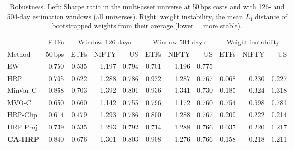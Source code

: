 \begin{table}[!htbp]\centering\small
\caption{Robustness. Left: Sharpe ratio in the multi-asset universe at 50\,bps costs and with 126- and 504-day estimation windows (all universes). Right: weight instability, the mean $L_1$ distance of bootstrapped weights from their average (lower = more stable).}\label{tab:robust}
\begin{tabular}{l r rrr rrr rrr}\toprule
 & ETFs & \multicolumn{3}{c}{Window 126 days} & \multicolumn{3}{c}{Window 504 days} & \multicolumn{3}{c}{Weight instability}\\
\cmidrule(lr){3-5}\cmidrule(lr){6-8}\cmidrule(lr){9-11}
Method & 50\,bps & ETFs & NIFTY & US & ETFs & NIFTY & US & ETFs & NIFTY & US\\\midrule
EW & 0.750 & 0.535 & 1.197 & 0.794 & 0.701 & 1.196 & 0.775 & -- & -- & --\\
HRP & 0.705 & 0.622 & 1.288 & 0.786 & 0.932 & 1.287 & 0.767 & 0.068 & 0.230 & 0.227\\
MinVar-C & 0.868 & 0.703 & 1.392 & 0.801 & 0.936 & 1.341 & 0.730 & 0.185 & 0.324 & 0.318\\
MVO-C & 0.650 & 0.660 & 1.142 & 0.755 & 0.796 & 1.172 & 0.760 & 0.754 & 0.698 & 0.781\\
HRP-Clip & 0.614 & 0.479 & 1.293 & 0.786 & 0.800 & 1.288 & 0.767 & 0.209 & 0.222 & 0.214\\
HRP-Proj & 0.739 & 0.535 & 1.293 & 0.792 & 0.714 & 1.288 & 0.766 & 0.037 & 0.220 & 0.217\\
\textbf{CA-HRP} & 0.840 & 0.676 & 1.301 & 0.803 & 0.908 & 1.276 & 0.766 & 0.158 & 0.218 & 0.211\\
\bottomrule\end{tabular}\end{table}